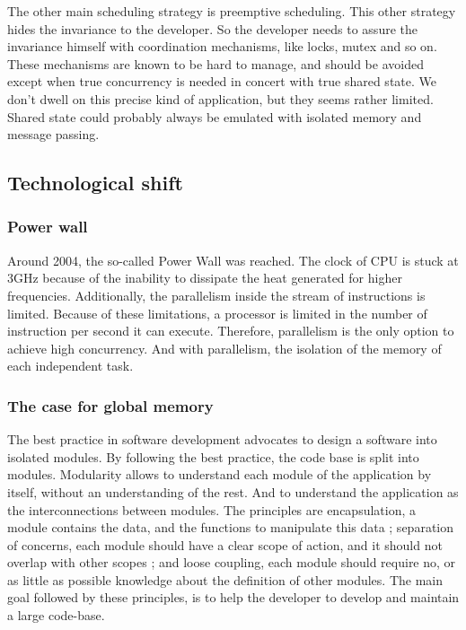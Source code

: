 The other main scheduling strategy is preemptive scheduling.
This other strategy hides the invariance to the developer.
So the developer needs to assure the invariance himself with coordination mechanisms, like locks, mutex and so on.
These mechanisms are known to be hard to manage, and should be avoided except when true concurrency is needed in concert with true shared state.
We don't dwell on this precise kind of application, but they seems rather limited.
Shared state could probably always be emulated with isolated memory and message passing.

\subsection{Technological shift}

\subsubsection{Power wall}

Around 2004, the so-called Power Wall was reached.
The clock of CPU is stuck at 3GHz because of the inability to dissipate the heat generated for higher frequencies.
Additionally, the parallelism inside the stream of instructions is limited.
Because of these limitations, a processor is limited in the number of instruction per second it can execute.
Therefore, parallelism is the only option to achieve high concurrency.
And with parallelism, the isolation of the memory of each independent task.

\subsubsection{The case for global memory}

The best practice in software development advocates to design a software into isolated modules.
By following the best practice, the code base is split into modules.
Modularity allows to understand each module of the application by itself, without an understanding of the rest.
And to understand the application as the interconnections between modules.
The principles are encapsulation, a module contains the data, and the functions to manipulate this data ; separation of concerns, each module should have a clear scope of action, and it should not overlap with other scopes ; and loose coupling, each module should require no, or as little as possible knowledge about the definition of other modules.
The main goal followed by these principles, is to help the developer to develop and maintain a large code-base.


